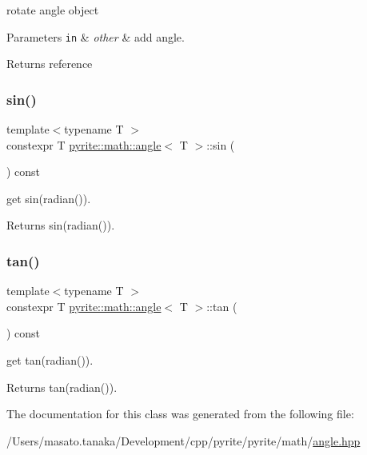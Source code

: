 rotate angle object


\begin{DoxyParams}[1]{Parameters}
\mbox{\tt in}  & {\em other} & add angle. \\
\hline
\end{DoxyParams}
\begin{DoxyReturn}{Returns}
reference 
\end{DoxyReturn}
\mbox{\label{classpyrite_1_1math_1_1angle_a52b2bed9f8df78271f96ee0c79f8c8a8}} 
\subsubsection{\texorpdfstring{sin()}{sin()}}
{\footnotesize\ttfamily template$<$typename T $>$ \\
constexpr T \mbox{\hyperlink{classpyrite_1_1math_1_1angle}{pyrite\+::math\+::angle}}$<$ T $>$\+::sin (\begin{DoxyParamCaption}{ }\end{DoxyParamCaption}) const\hspace{0.3cm}{\ttfamily [inline]}}

get sin(radian()). \begin{DoxyReturn}{Returns}
sin(radian()). 
\end{DoxyReturn}
\mbox{\label{classpyrite_1_1math_1_1angle_a1d63fa42bc9004aa686fe2992f235ebb}} 
\subsubsection{\texorpdfstring{tan()}{tan()}}
{\footnotesize\ttfamily template$<$typename T $>$ \\
constexpr T \mbox{\hyperlink{classpyrite_1_1math_1_1angle}{pyrite\+::math\+::angle}}$<$ T $>$\+::tan (\begin{DoxyParamCaption}{ }\end{DoxyParamCaption}) const\hspace{0.3cm}{\ttfamily [inline]}}

get tan(radian()). \begin{DoxyReturn}{Returns}
tan(radian()). 
\end{DoxyReturn}


The documentation for this class was generated from the following file\+:\begin{DoxyCompactItemize}
\item 
/\+Users/masato.\+tanaka/\+Development/cpp/pyrite/pyrite/math/\mbox{\hyperlink{angle_8hpp}{angle.\+hpp}}\end{DoxyCompactItemize}
